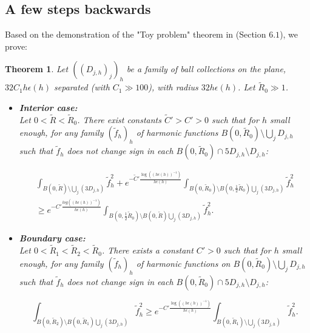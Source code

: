 \documentclass[leqno,11pt,letterpaper, english]{amsart}
\theoremstyle{plain}
\newtheorem{thm}{Theorem}
\theoremstyle{definition}
\numberwithin{equation}{section}
\begin{document}
\subsection{A few steps backwards}
\label{subsect: retourarriere}
Based on the demonstration of the "Toy problem" theorem in \cite{logunov2020landisconjectureexponentialdecay} (Section $6.1$), we prove:
\begin{thm}
Let $((D_{j,h})_j)_h$ be a family of ball collections on the plane, $32C_1 h\epsilon(h)$ separated (with $C_1 \gg 100$), with radius $32h\epsilon(h)$. Let $\tilde{R}_0 \gg 1$.
\begin{itemize}
    \item \textbf{Interior case:}\\
    Let $0 < \tilde{R} < \tilde{R}_0$. There exist constants $\tilde{C}' > C' > 0$ such that for $h$ small enough, for any family $(\tilde{f}_h)_h$ of harmonic functions $B(0,\tilde{R}_0)\setminus \bigcup_j D_{j,h}$  such that $\tilde{f}_h$ does not change sign in each $B(0, \tilde{R}_0) \cap 5D_{j,h} \setminus D_{j,h}$:

		\begin{multline}
			\int_{B(0,\tilde{R})\setminus \bigcup_j(3D_{j,h})} \tilde{f}_h^2+e^{-\tilde{C}'\frac{\log \left((h\epsilon(h))^{-1}\right)}{h\epsilon(h)}}\int_{B(0,\tilde{R}_0)\setminus B(0,\frac{1}{2}\tilde{R}_0)\bigcup_j (3D_{j,h})} \tilde{f}_h^2 \\
			\geq e^{-C'\frac{log\left((h\epsilon(h))^{-1}\right)}{h\epsilon(h)}}\int_{B(0,\frac{1}{2}\tilde{R}_0)\setminus B(0,\tilde{R})\bigcup_j(3D_{j,h})} \tilde{f}_h^2 .
		\end{multline}


    \item \textbf{Boundary case:}\\
    Let $0 < \tilde{R}_1 < \tilde{R}_2 < \tilde{R}_0$. There exists a constant $C' > 0$ such that for $h$ small enough, for any family $(\tilde{f}_h)_h$ of harmonic functions on $B(0,\tilde{R}_0)\setminus \bigcup_j D_{j,h}$ such that $\tilde{f}_h$ does not change sign in each $B(0, \tilde{R}_0) \cap 5D_{j,h} \setminus D_{j,h}$:

		\begin{equation}
			\int_{B(0,\tilde{R}_2)\setminus B(0,\tilde{R}_1)\bigcup_j(3D_{j,h})} \tilde{f}_h^2\geq e^{-C'\frac{\log \left((h\epsilon(h))^{-1}\right)}{h\epsilon(h)}}\int_{B(0,\tilde{R}_1)\setminus \bigcup_j(3D_{j,h})} \tilde{f}_h^2. 
		\end{equation}
\end{itemize}
\end{thm}
\end{document}

